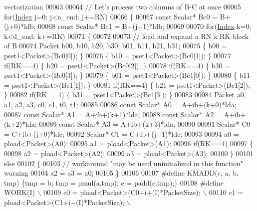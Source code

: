 \begin{DoxyCode}
{       vectorization}
00063     
00064     \textcolor{comment}{// Let's process two columns of B-C at once}
00065     \textcolor{keywordflow}{for}(\hyperlink{namespace_eigen_a62e77e0933482dafde8fe197d9a2cfde}{Index} j=0; j<n\_end; j+=RN)
00066     \{
00067       \textcolor{keyword}{const} Scalar* Bc0 = B+(j+0)*ldb;
00068       \textcolor{keyword}{const} Scalar* Bc1 = B+(j+1)*ldb;
00069       
00070       \textcolor{keywordflow}{for}(\hyperlink{namespace_eigen_a62e77e0933482dafde8fe197d9a2cfde}{Index} k=0; k<d\_end; k+=RK)
00071       \{
00072         
00073         \textcolor{comment}{// load and expand a RN x RK block of B}
00074         Packet b00, b10, b20, b30, b01, b11, b21, b31;
00075                   \{ b00 = pset1<Packet>(Bc0[0]); \}
00076                   \{ b10 = pset1<Packet>(Bc0[1]); \}
00077         \textcolor{keywordflow}{if}(RK==4) \{ b20 = pset1<Packet>(Bc0[2]); \}
00078         \textcolor{keywordflow}{if}(RK==4) \{ b30 = pset1<Packet>(Bc0[3]); \}
00079                   \{ b01 = pset1<Packet>(Bc1[0]); \}
00080                   \{ b11 = pset1<Packet>(Bc1[1]); \}
00081         \textcolor{keywordflow}{if}(RK==4) \{ b21 = pset1<Packet>(Bc1[2]); \}
00082         \textcolor{keywordflow}{if}(RK==4) \{ b31 = pset1<Packet>(Bc1[3]); \}
00083         
00084         Packet a0, a1, a2, a3, c0, c1, t0, t1;
00085         
00086         \textcolor{keyword}{const} Scalar* A0 = A+ib+(k+0)*lda;
00087         \textcolor{keyword}{const} Scalar* A1 = A+ib+(k+1)*lda;
00088         \textcolor{keyword}{const} Scalar* A2 = A+ib+(k+2)*lda;
00089         \textcolor{keyword}{const} Scalar* A3 = A+ib+(k+3)*lda;
00090         
00091         Scalar* C0 = C+ib+(j+0)*ldc;
00092         Scalar* C1 = C+ib+(j+1)*ldc;
00093         
00094                   a0 = pload<Packet>(A0);
00095                   a1 = pload<Packet>(A1);
00096         \textcolor{keywordflow}{if}(RK==4)
00097         \{
00098           a2 = pload<Packet>(A2);
00099           a3 = pload<Packet>(A3);
00100         \}
00101         \textcolor{keywordflow}{else}
00102         \{
00103           \textcolor{comment}{// workaround "may be used uninitialized in this function" warning}
00104           a2 = a3 = a0;
00105         \}
00106         
00107 \textcolor{preprocessor}{#define KMADD(c, a, b, tmp) \{tmp = b; tmp = pmul(a,tmp); c = padd(c,tmp);\}}
00108 \textcolor{preprocessor}{#define WORK(I)  \(\backslash\)}
00109 \textcolor{preprocessor}{                     c0 = pload<Packet>(C0+i+(I)*PacketSize);    \(\backslash\)}
00110 \textcolor{preprocessor}{                     c1 = pload<Packet>(C1+i+(I)*PacketSize);    \(\backslash\)}

\end{DoxyCode}
